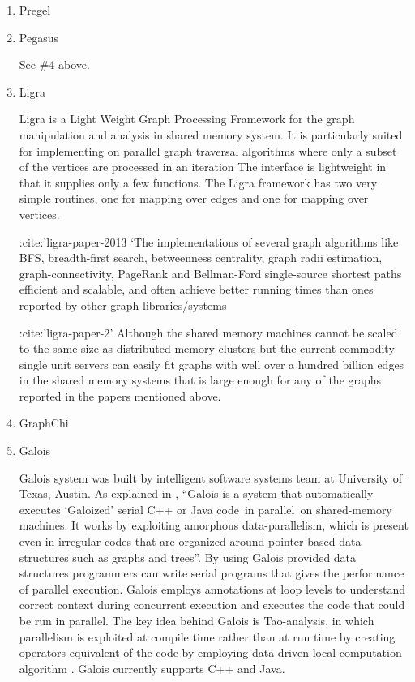 \begin{enumerate}
\item {} 
Pregel

\item {} 
Pegasus

See \#4 above.

\item {} 
Ligra

Ligra is a Light Weight Graph Processing Framework for the graph
manipulation and analysis in shared memory system. It is
particularly suited for implementing on parallel graph traversal
algorithms where only a subset of the vertices are processed in an
iteration The interface is lightweight in that it supplies only a
few functions. The Ligra framework has two very simple routines,
one for mapping over edges and one for mapping over vertices.

:cite:'ligra-paper-2013 `The implementations of several graph
algorithms like BFS, breadth-first search, betweenness centrality,
graph radii estimation, graph-connectivity, PageRank and
Bellman-Ford single-source shortest paths efficient and scalable,
and often achieve better running times than ones reported by other
graph libraries/systems

:cite:'ligra-paper-2' Although the shared memory machines cannot
be scaled to the same size as distributed memory clusters but the
current commodity single unit servers can easily fit graphs with
well over a hundred billion edges in the shared memory systems
that is large enough for any of the graphs reported in the papers
mentioned above.

\item {} 
GraphChi

\item {} 
Galois

Galois system was built by intelligent software systems team at
University of Texas, Austin. As explained in
\label{\detokenize{i524/technologies:id298}}{\hyperref[\detokenize{i524/technologies:www-galoissite}]{\sphinxcrossref{{[}252{]}}}}, “Galois is a system that automatically
executes `Galoized' serial C++ or Java code in parallel on
shared-memory machines. It works by exploiting amorphous
data-parallelism, which is present even in irregular codes that
are organized around pointer-based data structures such as graphs
and trees”. By using Galois provided data structures programmers
can write serial programs that gives the performance of parallel
execution. Galois employs annotations at loop levels to
understand correct context during concurrent execution and
executes the code that could be run in parallel. The key idea
behind Galois is Tao-analysis, in which parallelism is exploited
at compile time rather than at run time by creating operators
equivalent of the code by employing data driven local computation
algorithm \label{\detokenize{i524/technologies:id299}}{\hyperref[\detokenize{i524/technologies:taoparallelismpaper}]{\sphinxcrossref{{[}253{]}}}}. Galois currently supports
C++ and Java.


\end{enumerate}
